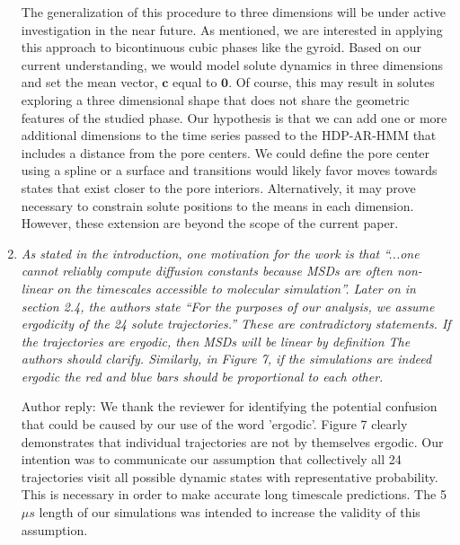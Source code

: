 \documentclass{article}
\begin{document}
\begin{enumerate}[label={Comment \theenumi :}, leftmargin=3.9\parindent]
    The generalization of this procedure to three dimensions will be under active investigation 
    in the near future. As mentioned, we are interested in applying this approach to bicontinuous
    cubic phases like the gyroid. Based on our current understanding, we would model solute dynamics
    in three dimensions and set the mean vector, $\mathbf{c}$ equal to $\mathbf{0}$. Of course, this
    may result in solutes exploring a three dimensional shape that does not share the geometric 
    features of the studied phase. Our hypothesis is that we can add one or more additional 
    dimensions to the time series passed to the HDP-AR-HMM that includes a distance from the pore centers. 
    We could define the pore center using a spline or a surface and transitions would likely
    favor moves towards states that exist closer to the pore interiors. Alternatively, it may prove
    necessary to constrain solute positions to the means in each dimension. However, these extension
    are beyond the scope of the current paper.
    
    
    \item \textit{As stated in the introduction, one motivation for the work is that “...one 
    cannot reliably compute diffusion constants because MSDs are often non-linear on the timescales
    accessible to molecular simulation”. Later on in section 2.4, the authors state “For the 
    purposes of our analysis, we assume ergodicity of the 24 solute trajectories.” These are 
    contradictory statements. If the trajectories are ergodic, then MSDs will be linear by 
    definition The authors should clarify. Similarly, in Figure 7, if the simulations are indeed 
    ergodic the red and blue bars should be proportional to each other.}
    
    Author reply: We thank the reviewer for identifying the potential confusion that could be
    caused by our use of the word 'ergodic'. Figure 7 clearly demonstrates that individual trajectories
    are not by themselves ergodic. Our intention was to communicate our assumption that collectively all 24 
    trajectories visit all possible dynamic states with representative probability. This is 
    necessary in order to make accurate long timescale predictions. The 5 $\mu s$ length of our 
    simulations was intended to increase the validity of this assumption. 
    

\end{enumerate}
\end{document}
